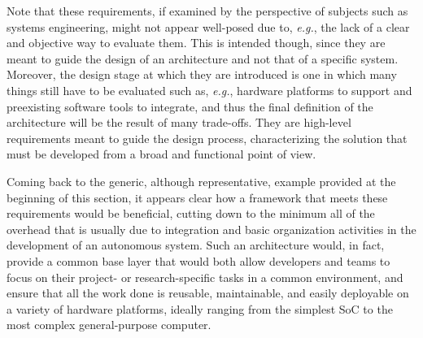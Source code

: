 Note that these requirements, if examined by the perspective of subjects such as systems engineering, might not appear well-posed due to, \emph{e.g.}, the lack of a clear and objective way to evaluate them. This is intended though, since they are meant to guide the design of an architecture and not that of a specific system. Moreover, the design stage at which they are introduced is one in which many things still have to be evaluated such as, \emph{e.g.}, hardware platforms to support and preexisting software tools to integrate, and thus the final definition of the architecture will be the result of many trade-offs. They are high-level requirements meant to guide the design process, characterizing the solution that must be developed from a broad and functional point of view.

Coming back to the generic, although representative, example provided at the beginning of this section, it appears clear how a framework that meets these requirements would be beneficial, cutting down to the minimum all of the overhead that is usually due to integration and basic organization activities in the development of an autonomous system. Such an architecture would, in fact, provide a common base layer that would both allow developers and teams to focus on their project- or research-specific tasks in a common environment, and ensure that all the work done is reusable, maintainable, and easily deployable on a variety of hardware platforms, ideally ranging from the simplest SoC to the most complex general-purpose computer.

